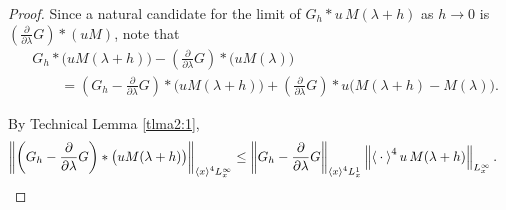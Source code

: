 \documentclass[../dissertation.tex]{subfiles}
\begin{document}
\begin{proof}
	Since a natural candidate for the limit of $G_h * u\, M(\lambda+h)$
	as $h\to 0$ is $\left(\frac{\partial}{\partial \lambda}G\right) * (uM)$,
	note that
	\begin{align}
		&G_h*\big(uM(\lambda+h)\big) 
				- \left(\frac{\partial}{\partial \lambda}G\right) 
					* \big(uM(\lambda)\big) \\
			&\qquad=
				\left(G_h - \frac{\partial}{\partial \lambda}G\right)
						* \big(uM(\lambda +h)\big)
					+ \left(\frac{\partial}{\partial \lambda}G\right)
						* u \big(M(\lambda+h) - M(\lambda)\big).
				\nonumber
	\end{align}
	
	By Technical Lemma \ref{tlma2:1}, 
	\begin{align*}
		\left\|
			\left(G_h - \frac{\partial}{\partial \lambda}G\right)
			* \big( uM(\lambda+h)\big)
		\right\|_{\left\langle x \right\rangle^4L_x^\infty}
			&\leq 
				\left\|
					G_h - \frac{\partial}{\partial \lambda}G
				\right\|_{\left\langle x \right\rangle^4 L_x^1}
				\left\|
					\left\langle \kern 0.5ex \cdot \kern 0.5ex \right\rangle^4
					u\,M(\lambda+h)
				\right\|_{L_x^\infty}.
	\end{align*}

\end{proof}
\end{document}
